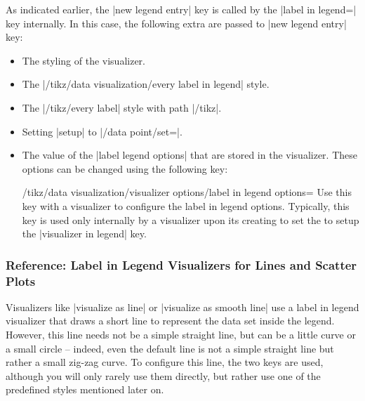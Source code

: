 As indicated earlier, the |new legend entry| key is called by the
|label in legend=| key internally. In this case, the following
extra  are passed to |new legend entry| key:
%
\begin{itemize}
    \item The styling of the visualizer.
    \item The |/tikz/data visualization/every label in legend| style.
    \item The |/tikz/every label| style with path |/tikz|.
    \item Setting |setup| to |/data point/set=|.
    \item The value of the |label legend options| that are stored in the
        visualizer. These options can be changed using the following key:
        \begin{key}{/tikz/data visualization/visualizer options/label in legend options=}
            Use this key with a visualizer to configure the label in legend
            options. Typically, this key is used only internally by a
            visualizer upon its creating to set the  to setup the
            |visualizer in legend| key.
        \end{key}
\end{itemize}


\subsubsection{Reference: Label in Legend Visualizers for Lines and Scatter Plots}

Visualizers like |visualize as line| or |visualize as smooth line| use a label
in legend visualizer that draws a short line to represent the data set inside
the legend. However, this line needs not be a simple straight line, but can be
a little curve or a small circle -- indeed, even the default line is not a
simple straight line but rather a small zig-zag curve. To configure this line,
the two keys are used, although you will only rarely use them directly, but
rather use one of the predefined styles mentioned later on.

